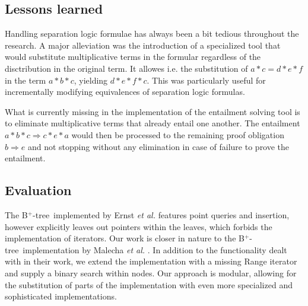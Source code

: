 \documentclass[a4paper,UKenglish,cleveref, cref, thm-restate]{lipics-v2021}
\newcommand{\btree}{B$^+$-tree}
\begin{document}
\subsection{Lessons learned}

Handling separation logic formulae has always been
a bit tedious throughout the research.
A major alleviation was the introduction of a specialized tool
that would substitute multiplicative terms in the formular
regardless of the disctribution in the original term.
It allowes i.e. the substitution of $a * c = d * e * f$ in
the term $a * b * c$, yielding $d * e * f * c$.
This was particularly useful for incrementally
modifying equivalences of separation logic formulas.

What is currently missing in the implementation of the entailment
solving tool is to eliminate multiplicative terms that
already entail one another.
The entailment $a * b * c \Rightarrow c * e * a$ would
then be processed to the remaining proof obligation $b \Rightarrow e$
and not stopping without any elimination in case of failure to prove the entailment.



\subsection{Evaluation}


The \btree\ implemented by Ernst \emph{et al.} \cite{DBLP:journals/sosym/ErnstSR15} features point queries and insertion,
however explicitly leaves out pointers within the leaves,
which forbids the implementation of iterators.
Our work is closer in nature to the \btree\ implementation by Malecha \emph{et al.} \cite{DBLP:conf/popl/MalechaMSW10}.
In addition to the functionality dealt with in their work, we extend
the implementation with a missing Range iterator
and supply a binary search within nodes.
Our approach is modular, allowing for the substitution of parts
of the implementation with even more specialized and sophisticated implementations.
\end{document}
